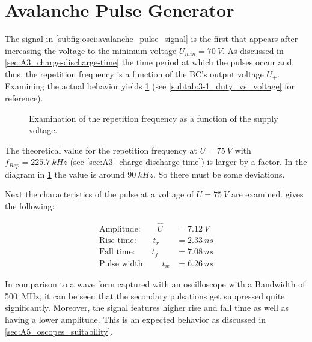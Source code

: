 \section{Avalanche Pulse Generator}
    The signal in \cref{subfig:osci:avalanche_pulse_signal} is the first that appears after increasing the voltage to the minimum
    voltage $ U_{min}=\SI{70}{V} $. As discussed in \cref{sec:A3_charge-discharge-time} the time period at which the pulses
    occur and, thus, the repetition frequency is a function of the BC's output voltage \( U_+ \). Examining the
    actual behavior yields \cref{fig:repetition-frequency} (see \cref{subtab:3-1_duty_vs_voltage} for reference).\par
    \begin{figure}[H]
        \centering
        
        \caption[Examination repetition frequency over supply voltage]{Examination of the repetition frequency as a function of the supply voltage.}
        \label{fig:repetition-frequency}
    \end{figure}
    The theoretical value for the repetition frequency at $ U=\SI{75}{V} $ with $ f_{Rep}=\SI{225.7}{kHz} $ (see \cref{sec:A3_charge-discharge-time})
    is larger by a factor. In the diagram in \cref{fig:repetition-frequency} the value is around
    $ \SI{90}{kHz} $. So there must be some deviations.\par\medskip
    Next the characteristics of the pulse at a voltage of $ U=\SI{75}{V} $ are examined. 
    gives the following:\par
    \begin{align}
        \text{Amplitude:}\qquad \hat{U}&=\SI{7.12}{V}\\
        \text{Rise time:}\qquad t_r&=\SI{2.33}{ns}\\
        \text{Fall time:}\qquad t_f&=\SI{7.08}{ns}\\
        \text{Pulse width:}\qquad t_w&=\SI{6.26}{ns}
    \end{align}\par
    In comparison to a wave form captured with an oscilloscope with a Bandwidth of \SI{500}{MHz}, it can be seen that the secondary pulsations get suppressed
    quite significantly. Moreover, the signal features higher rise and fall time as well as having a lower amplitude.
    This is an expected behavior as discussed in \cref{sec:A5_oscopes_suitability}.\par
